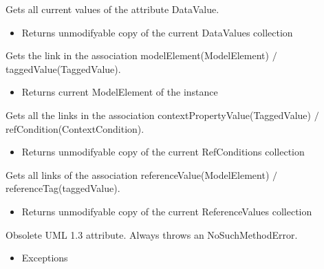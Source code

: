 \begin{desc}Gets all current values of the attribute DataValue.
\begin{itemize}
\item{Returns unmodifyable copy of the current DataValues collection }
\end{itemize}
\end{desc}

\begin{desc}Gets the link in the association modelElement(ModelElement)
 $/$ taggedValue(TaggedValue).
\begin{itemize}
\item{Returns current ModelElement of the instance }
\end{itemize}
\end{desc}

\begin{desc}Gets all the links in the association contextPropertyValue(TaggedValue)
 $/$ refCondition(ContextCondition).
\begin{itemize}
\item{Returns unmodifyable copy of the current RefConditions collection }
\end{itemize}
\end{desc}

\begin{desc}Gets all links of the association referenceValue(ModelElement)
 $/$ referenceTag(taggedValue).
\begin{itemize}
\item{Returns unmodifyable copy of the current ReferenceValues collection }
\end{itemize}
\end{desc}

\begin{desc}Obsolete UML 1.3 attribute. Always throws an NoSuchMethodError.
\begin{itemize}
\item{{Exceptions}
}
\end{itemize}
\end{desc}

